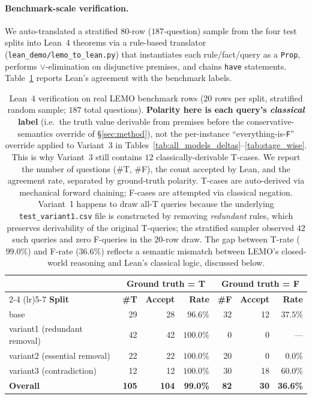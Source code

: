 \documentclass{article}
\begin{document}
\paragraph{Benchmark-scale verification.}
We auto-translated a stratified $80$-row ($187$-question) sample from the four test splits into Lean~4 theorems via a rule-based translator (\texttt{lean\_demo/lemo\_to\_lean.py}) that instantiates each rule/fact/query as a \texttt{Prop}, performs $\lor$-elimination on disjunctive premises, and chains \texttt{have} statements. Table~\ref{tab:lean_bench} reports Lean's agreement with the benchmark labels.

\begin{table}[h]
\centering
\small
\caption{Lean~4 verification on real LEMO benchmark rows (20 rows per split,
stratified random sample; $187$ total questions). \textbf{Polarity here is each query's
\emph{classical} label} (i.e.\ the truth value derivable from premises before the
conservative-semantics override of \S\ref{sec:method}), not the per-instance
``everything-is-\texttt{F}'' override applied to Variant~3 in
Tables~\ref{tab:all_models_deltas}--\ref{tab:stage_wise}. This is why Variant~3
still contains $12$ classically-derivable T-cases. We report the number of
questions (\#T, \#F), the count accepted by Lean, and the agreement rate, separated
by ground-truth polarity. T-cases are auto-derived via mechanical forward chaining;
F-cases are attempted via classical negation. Variant~1 happens to draw all-T
queries because the underlying \texttt{test\_variant1.csv} file is constructed by
removing \emph{redundant} rules, which preserves derivability of the original
T-queries; the stratified sampler observed $42$ such queries and zero F-queries
in the $20$-row draw. The gap between T-rate ($99.0\%$) and F-rate ($36.6\%$)
reflects a semantic mismatch between LEMO's closed-world reasoning and Lean's
classical logic, discussed below.}
\label{tab:lean_bench}
\begin{tabular}{lrrrrrr}
\toprule
& \multicolumn{3}{c}{\textbf{Ground truth = T}} & \multicolumn{3}{c}{\textbf{Ground truth = F}} \\
\cmidrule(lr){2-4} \cmidrule(lr){5-7}
\textbf{Split} & \textbf{\#T} & \textbf{Accept} & \textbf{Rate} & \textbf{\#F} & \textbf{Accept} & \textbf{Rate} \\
\midrule
base                         & 29  & 28  & $96.6\%$ & 32  & 12 & $37.5\%$ \\
variant1 (redundant removal) & 42  & 42  & $100.0\%$ & 0   & 0  & --- \\
variant2 (essential removal) & 22  & 22  & $100.0\%$ & 20  & 0  & $0.0\%$ \\
variant3 (contradiction)     & 12  & 12  & $100.0\%$ & 30  & 18 & $60.0\%$ \\
\midrule
\textbf{Overall}             & \textbf{105} & \textbf{104} & \textbf{99.0\%} & \textbf{82} & \textbf{30} & \textbf{36.6\%} \\
\bottomrule
\end{tabular}
\end{table}
\end{document}
